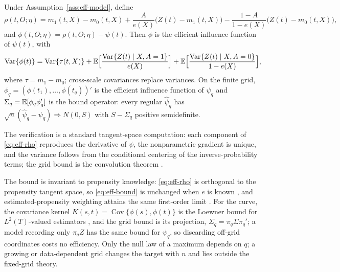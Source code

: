 \begin{theorem}
\label{thm:eff-eif}
Under Assumption~\ref{ass:eff-model}, define
\begin{equation}
\rho(t,O;\eta)=m_1(t,X)-m_0(t,X)+\frac{A}{e(X)}\bigl(Z(t)-m_1(t,X)\bigr)-\frac{1-A}{1-e(X)}\bigl(Z(t)-m_0(t,X)\bigr),
\label{eq:eff-rho}
\end{equation}
and $\phi(t,O;\eta)=\rho(t,O;\eta)-\psi(t)$. Then $\phi$ is the efficient influence function of $\psi(t)$, with
\begin{equation}
\operatorname{Var}\{\phi(t)\}
=\operatorname{Var}\{\tau(t,X)\}
+\mathbb{E}\Bigl[\frac{\operatorname{Var}\{Z(t)\mid X,A=1\}}{e(X)}\Bigr]
+\mathbb{E}\Bigl[\frac{\operatorname{Var}\{Z(t)\mid X,A=0\}}{1-e(X)}\Bigr],
\label{eq:eff-bound}
\end{equation}
where $\tau=m_1-m_0$; cross-scale covariances replace variances. On the finite grid, $\phi_q=(\phi(t_1),\dots,\phi(t_q))'$ is the efficient influence function of $\psi_q$ and $\Sigma_q=\mathbb{E}[\phi_q\phi_q']$ is the bound operator: every regular $\hat\psi_q$ has $\sqrt n(\hat\psi_q-\psi_q)\Rightarrow N(0,S)$ with $S-\Sigma_q$ positive semidefinite.
\end{theorem}
The verification is a standard tangent-space computation: each component of \eqref{eq:eff-rho} reproduces the derivative of $\psi$, the nonparametric gradient is unique, and the variance follows from the conditional centering of the inverse-probability terms; the grid bound is the convolution theorem \cite{vdv_wellner_1996,bickel_klaassen_ritov_wellner_1993}.

The bound is invariant to propensity knowledge: \eqref{eq:eff-rho} is orthogonal to the propensity tangent space, so \eqref{eq:eff-bound} is unchanged when $e$ is known \cite{hahn_1998}, and estimated-propensity weighting attains the same first-order limit \cite{hirano_imbens_ridder_2003}. For the curve, the covariance kernel $K(s,t)=\operatorname{Cov}\{\phi(s),\phi(t)\}$ is the Loewner bound for $L^2(T)$-valued estimators \cite{vdv_1991,vdv_2002}, and the grid bound is its projection, $\Sigma_q=\pi_q\Sigma\pi_q'$; a model recording only $\pi_qZ$ has the same bound for $\psi_q$, so discarding off-grid coordinates costs no efficiency. Only the null law of a maximum depends on $q$; a growing or data-dependent grid changes the target with $n$ and lies outside the fixed-grid theory.

